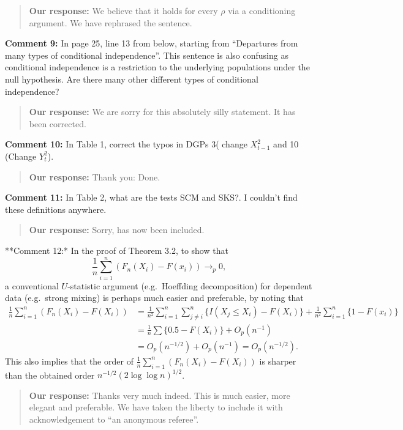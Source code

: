 \documentclass[
  12pt,
  letterpaper]{article}
\numberwithin{equation}{section}
\begin{document}
\begin{quote}
\textbf{Our response:} We believe that it holds for every \(\rho\) via a conditioning argument. We have rephrased the sentence.
\end{quote}

\textbf{Comment 9:} In page 25, line 13 from below, starting from ``Departures from many types of conditional independence''. This sentence is also confusing as conditional independence is a restriction to the underlying populations under the null hypothesis. Are there many other different types of conditional independence?

\begin{quote}
\textbf{Our response:} We are sorry for this absolutely silly statement. It has been corrected.
\end{quote}

\textbf{Comment 10:} In Table 1, correct the typos in DGPs 3( change \(X_{t-1}^2\) and 10 (Change \(Y_t^2\)).

\begin{quote}
\textbf{Our response:} Thank you: Done.
\end{quote}

\textbf{Comment 11:} In Table 2, what are the tests SCM and SKS?. I couldn't find these definitions anywhere.

\begin{quote}
\textbf{Our response:} Sorry, has now been included.
\end{quote}

**Comment 12:* In the proof of Theorem 3.2, to show that
\[
\frac{1}{n}\sum_{i=1}^{n}(F_n(X_i)-F(x_i)) \to_p 0,
\]
a conventional \(U\)-statistic argument (e.g.~Hoeffding decomposition) for dependent data (e.g.~strong mixing) is perhaps much easier and preferable, by noting that
\begin{align*}
\frac{1}{n}\sum_{i=1}^{n}(F_n(X_i)-F(X_i)) &= \frac{1}{n^2}\sum_{i=1}^{n}\sum_{j \neq i}^{n}\{I(X_j \leq X_i)-F(X_i)\}+\frac{1}{n^2}\sum_{i=1}^{n}\{1-F(x_i)\} \\
& = \frac{1}{n}\sum\{0.5 - F(X_i)\} + O_p(n^{-1}) \\
&= O_p(n^{-1/2})+O_p(n^{-1}) = O_p(n^{-1/2}).
\end{align*}
This also implies that the order of \(\frac{1}{n}\sum_{i=1}^{n}(F_n(X_i)-F(X_i))\) is sharper than the obtained order \(n^{-1/2}(2 \log \log n)^{1/2}\).

\begin{quote}
\textbf{Our response:} Thanks very much indeed. This is much easier, more elegant and preferable. We have taken the liberty to include it with acknowledgement to ``an anonymous referee''.
\end{quote}
\end{document}
